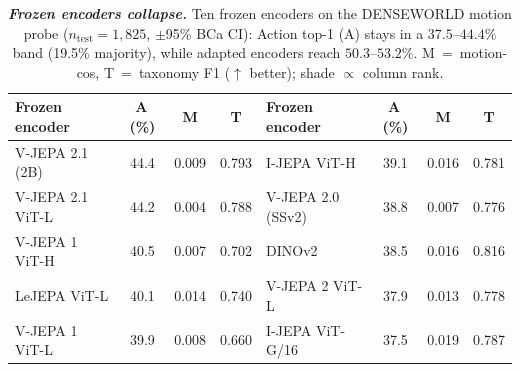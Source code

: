 \begin{table}[t]
\centering
\caption{\textbf{\emph{Frozen encoders collapse.}} Ten frozen encoders on the DENSEWORLD motion probe ($n_{\mathrm{test}}=1{,}825$, $\pm$95\% BCa CI): Action top-1 (A) stays in a $37.5$--$44.4\%$ band (19.5\% majority), while adapted encoders reach $50.3$--$53.2\%$. M~=~motion-cos, T~=~taxonomy F1 ($\uparrow$ better); shade $\propto$ column rank.}
\label{tab:frozen_scorecard}
\footnotesize\bfseries
\setlength{\tabcolsep}{4pt}
\renewcommand{\arraystretch}{1.0}
\begin{tabular}{@{}lccc@{\hskip 2.2em}lccc@{}}
\toprule
Frozen encoder & A\,(\%) & M & T & Frozen encoder & A\,(\%) & M & T \\
\midrule
V-JEPA 2.1 (2B) & \cellcolor{green!68}44.4 & \cellcolor{green!36}0.009 & \cellcolor{green!61}0.793 & I-JEPA ViT-H & \cellcolor{green!31}39.1 & \cellcolor{green!58}0.016 & \cellcolor{green!57}0.781 \\
V-JEPA 2.1 ViT-L & \cellcolor{green!67}44.2 & \cellcolor{red!38}0.004 & \cellcolor{green!59}0.788 & V-JEPA 2.0 (SSv2) & \cellcolor{green!30}38.8 & \cellcolor{green!30}0.007 & \cellcolor{green!56}0.776 \\
V-JEPA 1 ViT-H & \cellcolor{green!41}40.5 & \cellcolor{green!30}0.007 & \cellcolor{green!33}0.702 & DINOv2 & \cellcolor{green!27}38.5 & \cellcolor{green!58}0.016 & \cellcolor{green!68}0.816 \\
LeJEPA ViT-L & \cellcolor{green!38}40.1 & \cellcolor{green!52}0.014 & \cellcolor{green!45}0.740 & V-JEPA 2 ViT-L & \cellcolor{green!23}37.9 & \cellcolor{green!49}0.013 & \cellcolor{green!56}0.778 \\
V-JEPA 1 ViT-L & \cellcolor{green!37}39.9 & \cellcolor{green!33}0.008 & \cellcolor{red!38}0.660 & I-JEPA ViT-G/16 & \cellcolor{red!38}37.5 & \cellcolor{green!68}0.019 & \cellcolor{green!59}0.787 \\
\bottomrule
\end{tabular}
\end{table}




















































